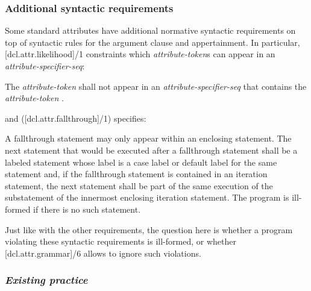 \subsubsection{Additional syntactic requirements}

\label{subsec:additionalreqs}
Some standard attributes have additional normative syntactic requirements on top of syntactic rules for the argument clause and appertainment. In particular, [dcl.attr.likelihood]/1 constraints which \emph{attribute-token}s can appear in an \emph{attribute-specifier-seq}:


\begin{adjustwidth}{0.5cm}{0.5cm}
The \emph{attribute-token}  shall not appear in an \emph{attribute-specifier-seq} that contains the \emph{attribute-token} .
\end{adjustwidth}

and ([dcl.attr.fallthrough]/1) specifies:

\begin{adjustwidth}{0.5cm}{0.5cm}
A fallthrough statement may only appear within an enclosing  statement. The next statement that would be executed after a fallthrough statement shall be a labeled statement whose label is a case label or default label for the same  statement and, if the fallthrough statement is contained in an iteration statement, the next statement shall be part of the same execution of the substatement of the innermost enclosing iteration statement. The program is ill-formed if there is no such statement.
\end{adjustwidth}

Just like with the other requirements, the question here is whether a program violating these syntactic requirements is ill-formed, or whether [dcl.attr.grammar]/6 allows to ignore such violations.

\subsubsection*{\emph{Existing practice}}


